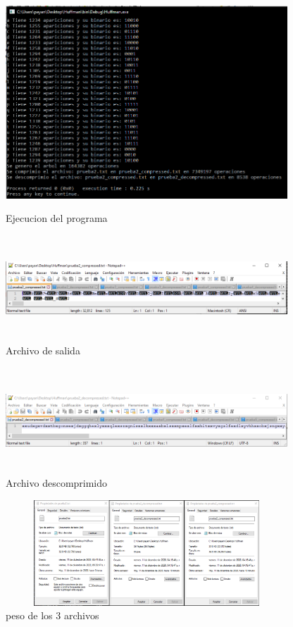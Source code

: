 \documentclass[spanish]{article}
\begin{document}
	\begin{figure}[H]
		\centering
		\includegraphics[width=400px,height=300px]{captura17}
		\caption{Ejecucion del programa}
	\end{figure}
	\begin{figure}[H]
		\centering
		\includegraphics[width=400px,height=150px]{captura18}
		\caption{Archivo de salida}
	\end{figure}
	\begin{figure}[H]
		\centering
		\includegraphics[width=400px,height=150px]{captura19}
		\caption{Archivo descomprimido}
	\end{figure}
	\begin{figure}[H]
		\centering
		\includegraphics[width=400px,height=150px]{captura20}
		\caption{peso de los 3 archivos}
	\end{figure}
\end{document}

